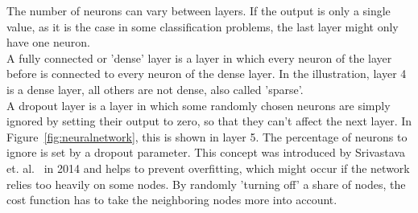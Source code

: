 \documentclass[
a4paper,
pagesize,
pdftex,
12pt,
ngerman,
fleqn,
final,
]{scrartcl}
\begin{document}
	The number of neurons can vary between layers. If the output is only a single value, as it is the case in some classification problems, the last layer might only have one neuron.\\
	A fully connected or 'dense' layer is a layer in which every neuron of the layer before is connected to every neuron of the dense layer. In the illustration, layer 4 is a dense layer, all others are not dense, also called 'sparse'.\\
	A dropout layer is a layer in which some randomly chosen neurons are simply ignored by setting their output to zero, so that they can't affect the next layer. In Figure~\ref{fig:neuralnetwork}, this is shown in layer 5. The percentage of neurons to ignore is set by a dropout parameter. This concept was introduced by Srivastava et. al.~\cite{Srivastava.2014} in 2014 and helps to prevent overfitting, which might occur if the network relies too heavily on some nodes. By randomly 'turning off' a share of nodes, the cost function has to take the neighboring nodes more into account.\\

	
\end{document}
